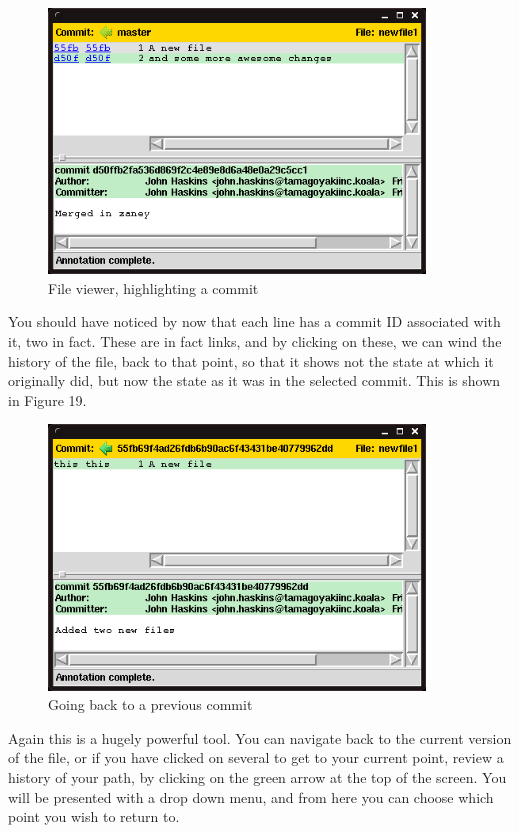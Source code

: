 \begin{figure}[hbt]
\centering
\includegraphics[width=10cm]{images/f-w5-d18.png}
\caption{File viewer, highlighting a commit}
\end{figure}

You should have noticed by now that each line has a commit ID associated with it, two in fact.
These are in fact links, and by clicking on these, we can wind the history of the file, back to that point, so that it shows not the state at which it originally did, but now the state as it was in the selected commit.
This is shown in Figure 19.

\begin{figure}[hbt]
\centering
\includegraphics[width=10cm]{images/f-w5-d19.png}
\caption{Going back to a previous commit}
\end{figure}

Again this is a hugely powerful tool.
You can navigate back to the current version of the file, or if you have clicked on several to get to your current point, review a history of your path, by clicking on the green arrow at the top of the screen.
You will be presented with a drop down menu, and from here you can choose which point you wish to return to.

